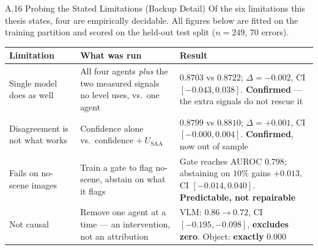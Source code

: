 \documentclass[aspectratio=169,11pt]{beamer}
\begin{document}
\begin{frame}{A.16 Probing the Stated Limitations (Backup Detail)}
\scriptsize
Of the six limitations this thesis states, four are empirically decidable. All figures below are fitted on the training
partition and scored on the held-out test split ($n=249$, $70$ errors).
\vspace{1mm}
\begin{center}
\tiny
\begin{tabular}{@{}p{2.3cm}p{3.7cm}p{4.6cm}@{}}
\toprule
\textbf{Limitation} & \textbf{What was run} & \textbf{Result} \\
\midrule
Single model does as well & All four agents \emph{plus} the two measured signals no level uses, vs.\ one agent & $0.8703$ vs $0.8722$; $\Delta=-0.002$, CI $[-0.043,0.038]$. \textbf{Confirmed} --- the extra signals do not rescue it \\
\addlinespace
Disagreement is not what works & Confidence alone vs.\ confidence $+\ U_{\text{SAA}}$ & $0.8799$ vs $0.8810$; $\Delta=+0.001$, CI $[-0.000,0.004]$. \textbf{Confirmed}, now out of sample \\
\addlinespace
Fails on no-scene images & Train a gate to flag no-scene, abstain on what it flags & Gate reaches AUROC $\mathbf{0.798}$; abstaining on $10\%$ gains $+0.013$, CI $[-0.014,0.040]$. \textbf{Predictable, not repairable} \\
\addlinespace
Not causal & Remove one agent at a time --- an intervention, not an attribution & VLM: $0.86\to0.72$, CI $[-0.195,-0.098]$, \textbf{excludes zero}. Object: \textbf{exactly} $0.000$ \\
\bottomrule
\end{tabular}
\end{center}
\end{frame}
\end{document}
